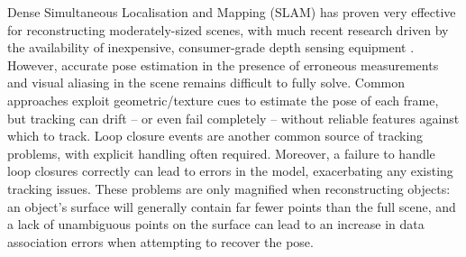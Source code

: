 Dense Simultaneous Localisation and Mapping (SLAM) has proven very effective for reconstructing moderately-sized scenes,
with much recent research driven by the availability of inexpensive, consumer-grade depth sensing equipment \cite{Newcombe2011,Niessner2013,Prisacariu2014}. 
However, accurate pose estimation in the presence of erroneous measurements and visual aliasing in the scene remains difficult to fully solve. Common approaches \cite{Besl1992,Levoy2001} exploit geometric/texture cues to estimate the pose of each frame, but tracking can drift -- or even fail completely -- without reliable features against which to track.
Loop closure events are another common source of tracking problems, with explicit handling often required. Moreover, a failure to handle loop closures correctly can lead to errors in the model, exacerbating any existing tracking issues.
These problems are only magnified when reconstructing objects: an object's surface will generally contain far fewer points than the full scene, and a lack of unambiguous points on the surface can lead to an increase in data association errors when attempting to recover the pose.




